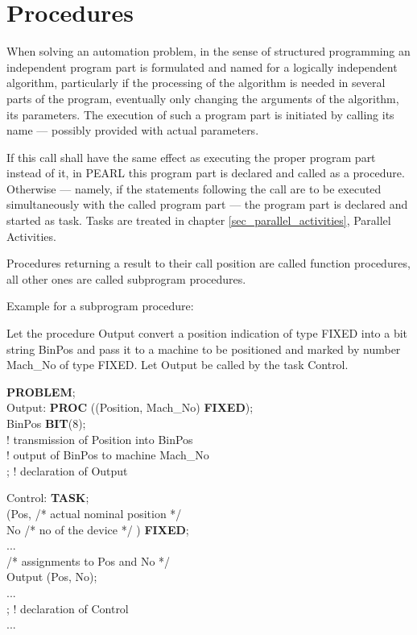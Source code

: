 \chapter{Procedures}   %

When solving an automation problem, in the sense of structured
programming an independent program part is formulated and named for a
logically independent algorithm, particularly if the processing of the
algorithm is needed in several parts of the program, eventually only
changing the arguments of the algorithm, its parameters. The execution
of such a program part is initiated by calling its name --- possibly
provided with actual parameters.

If this call shall have the same effect as executing the proper program
part instead of it, in PEARL this program part is declared and called
as a procedure. Otherwise --- namely, if the statements following the
call are to be executed simultaneously with the called program part ---
the program part is declared and started as task. Tasks are treated in
chapter \ref{sec_parallel_activities}, Parallel Activities.

Procedures returning a result to their call position are called function
procedures, all other ones are called subprogram procedures.

Example for a subprogram procedure:

Let the procedure Output convert a position indication of type FIXED
into a bit string BinPos and pass it to a machine to be positioned and
marked by number Mach\_No of type FIXED. Let Output be called by
the task Control.

{\bf PROBLEM};\\
\x Output: {\bf PROC} ((Position, Mach\_No) {\bf FIXED});\\
\x {} BinPos {\bf BIT}(8);\\
\x \x ! transmission of Position into BinPos\\
\x \x ! output of BinPos to machine Mach\_No \\
\x {}; ! declaration of Output

\x Control: {\bf TASK};\\
\x {} (Pos, /* actual nominal position */ \\
\x \x \x         No   /* no of the device */ ) {\bf FIXED};\\
\x \x ... \\
\x \x /* assignments to Pos and No */ \\
\x {} Output (Pos, No); \\
\x \x ... \\
\x {}; ! declaration of Control \\
\x ...

